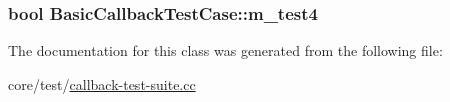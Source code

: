 \subsubsection[{\texorpdfstring{m\+\_\+test4}{m_test4}}]{\setlength{\rightskip}{0pt plus 5cm}bool Basic\+Callback\+Test\+Case\+::m\+\_\+test4\hspace{0.3cm}{\ttfamily [private]}}\hypertarget{classBasicCallbackTestCase_a973d98a1c4c02aec6f3e81e9fd853346}{}\label{classBasicCallbackTestCase_a973d98a1c4c02aec6f3e81e9fd853346}


The documentation for this class was generated from the following file\+:\begin{DoxyCompactItemize}
\item 
core/test/\hyperlink{callback-test-suite_8cc}{callback-\/test-\/suite.\+cc}\end{DoxyCompactItemize}
